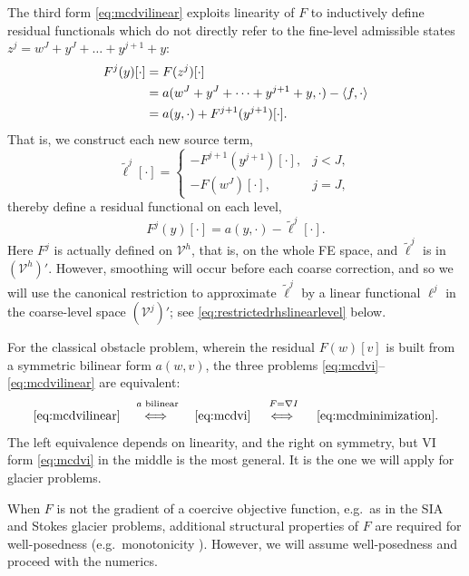 \documentclass[letterpaper,final,12pt,reqno]{amsart}
\theoremstyle{claim}
\newcommand{\grad}{\nabla}
\newcommand{\ip}[2]{\left<#1,#2\right>}
\numberwithin{equation}{section}
\numberwithin{figure}{section}
\numberwithin{table}{section}
\numberwithin{theorem}{section}
\begin{document}
The third form \eqref{eq:mcdvilinear} exploits linearity of $F$ to inductively define residual functionals which do not directly refer to the fine-level admissible states $z^j = w^J+y^J+\dots+y^{j+1}+y$:
\begin{align}
  F^j(y)[\cdot] &= F(z^j)[\cdot] \label{eq:residuallinearlevelderive} \\
                &= a(w^J+y^J+\dots+y^{j+1}+y,\cdot) - \ip{f}{\cdot} \notag \\
                &= a(y,\cdot) + F^{j+1}(y^{j+1})[\cdot]. \notag
\end{align}
That is, we construct each new source term,
\begin{equation}
  \tilde\ell^j[\cdot] = \begin{cases} - F^{j+1}(y^{j+1})[\cdot], & j < J, \\
                                      - F(w^J)[\cdot],   & j = J, \end{cases} \label{eq:rhslinearlevel}
\end{equation}
thereby define a residual functional on each level,
\begin{equation}
  F^j(y)[\cdot] = a(y,\cdot) - \tilde\ell^j[\cdot].  \label{eq:residuallinearlevel}
\end{equation}
Here $F^j$ is actually defined on $\mathcal{V}^h$, that is, on the whole FE space, and $\tilde\ell^j$ is in $(\mathcal{V}^h)'$.  However, smoothing will occur before each coarse correction, and so we will use the canonical restriction to approximate $\tilde\ell^j$ by a linear functional $\ell^j$ in the coarse-level space $(\mathcal{V}^j)'$; see \eqref{eq:restrictedrhslinearlevel} below.

For the classical obstacle problem, wherein the residual $F(w)[v]$ is built from a symmetric bilinear form $a(w,v)$, the three problems \eqref{eq:mcdvi}--\eqref{eq:mcdvilinear} are equivalent:
   $$\eqref{eq:mcdvilinear} \quad \stackrel{a \text{ bilinear}}{\iff\strut} \quad \eqref{eq:mcdvi} \quad \stackrel{F=\grad I}{\iff\strut} \quad \eqref{eq:mcdminimization}.$$
The left equivalence depends on linearity, and the right on symmetry, but VI form \eqref{eq:mcdvi} in the middle is the most general.  It is the one we will apply for glacier problems.

When $F$ is not the gradient of a coercive objective function, e.g.~as in the SIA and Stokes glacier problems, additional structural properties of $F$ are required for well-posedness (e.g.~monotonicity \cite{Bueler2020,JouvetBueler2012,KinderlehrerStampacchia1980}).  However, we will assume well-posedness and proceed with the numerics.
\end{document}
